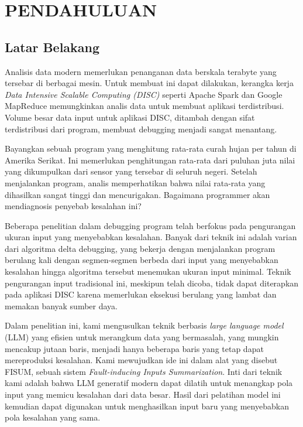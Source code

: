 \chapter{PENDAHULUAN}
\label{chap:pendahuluan}


\section{Latar Belakang}
\label{sec:latarbelakang}

Analisis data modern memerlukan penanganan data berskala terabyte yang tersebar di berbagai mesin. Untuk membuat ini dapat dilakukan, kerangka kerja \emph{Data Intensive Scalable Computing (DISC)} seperti Apache Spark dan Google MapReduce memungkinkan analis data untuk membuat aplikasi terdistribusi. Volume besar data input untuk aplikasi DISC, ditambah dengan sifat terdistribusi dari program, membuat debugging menjadi sangat menantang.

Bayangkan sebuah program yang menghitung rata-rata curah hujan per tahun di Amerika Serikat. Ini memerlukan penghitungan rata-rata dari puluhan juta nilai yang dikumpulkan dari sensor yang tersebar di seluruh negeri. Setelah menjalankan program, analis memperhatikan bahwa nilai rata-rata yang dihasilkan sangat tinggi dan mencurigakan. Bagaimana programmer akan mendiagnosis penyebab kesalahan ini?

Beberapa penelitian dalam debugging program telah berfokus pada pengurangan ukuran input yang menyebabkan kesalahan. Banyak dari teknik ini adalah varian dari algoritma delta debugging, yang bekerja dengan menjalankan program berulang kali dengan segmen-segmen berbeda dari input yang menyebabkan kesalahan hingga algoritma tersebut menemukan ukuran input minimal. Teknik pengurangan input tradisional ini, meskipun telah dicoba, tidak dapat diterapkan pada aplikasi DISC karena memerlukan eksekusi berulang yang lambat dan memakan banyak sumber daya.

Dalam penelitian ini, kami mengusulkan teknik berbasis \emph{large language model} (LLM) yang efisien untuk merangkum data yang bermasalah, yang mungkin mencakup jutaan baris, menjadi hanya beberapa baris yang tetap dapat mereproduksi kesalahan. Kami mewujudkan ide ini dalam alat yang disebut FISUM, sebuah sistem \emph{Fault-inducing Inputs Summarization}. Inti dari teknik kami adalah bahwa LLM generatif modern dapat dilatih untuk menangkap pola input yang memicu kesalahan dari data besar. Hasil dari pelatihan model ini kemudian dapat digunakan untuk menghasilkan input baru yang menyebabkan pola kesalahan yang sama.

